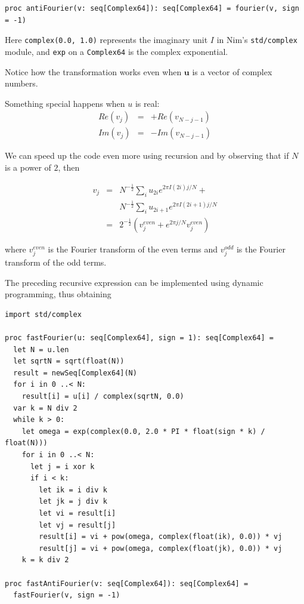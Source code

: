 \documentclass[justified, sixbynine]{tufte-book}
\def\ft{\small\tt}
\theoremstyle{plain}%
\newtheorem * {corollary}{Corollary}
\theoremstyle{definition}
\theoremstyle{remark}
\newtheorem * {remark}{Remark}
\newtheorem * {note}{Note}
\begin{document}
\begin{fullwidth}
\begin{lstlisting}
proc antiFourier(v: seq[Complex64]): seq[Complex64] = fourier(v, sign = -1)
\end{lstlisting}

Here {\ft complex(0.0, 1.0)} represents the imaginary unit $I$ in Nim's {\ft std/complex} module, and {\ft exp} on a {\ft Complex64} is the complex exponential.

Notice how the transformation works even when $\mathbf{u}$ is a vector of complex numbers.

Something special happens when $u$ is real:
\begin{eqnarray}
Re(v_j) &=& +Re(v_{N-j-1}) \\
Im(v_j) &=& -Im(v_{N-j-1})
\end{eqnarray}

We can speed up the code even more using recursion and by observing that if $N$ is a power of $2$, then

\begin{eqnarray}
v_j &=& N^{-\frac12} \sum_i u_{2i} e^{2\pi I (2i)j/N} + \\
             &&  N^{-\frac12} \sum_i u_{2i+1} e^{2\pi I (2i+1)j/N} \\
             &=& 2^{-\frac12} ( v_j^{even} + e^{2\pi j/N} v_j^{even} )
\end{eqnarray}

where $v_j^{even}$ is the Fourier transform of the even terms and $v_j^{odd}$ is the Fourier transform of the odd terms.

The preceding recursive expression can be implemented using dynamic programming, thus obtaining


\begin{lstlisting}
import std/complex

proc fastFourier(u: seq[Complex64], sign = 1): seq[Complex64] =
  let N = u.len
  let sqrtN = sqrt(float(N))
  result = newSeq[Complex64](N)
  for i in 0 ..< N:
    result[i] = u[i] / complex(sqrtN, 0.0)
  var k = N div 2
  while k > 0:
    let omega = exp(complex(0.0, 2.0 * PI * float(sign * k) / float(N)))
    for i in 0 ..< N:
      let j = i xor k
      if i < k:
        let ik = i div k
        let jk = j div k
        let vi = result[i]
        let vj = result[j]
        result[i] = vi + pow(omega, complex(float(ik), 0.0)) * vj
        result[j] = vi + pow(omega, complex(float(jk), 0.0)) * vj
    k = k div 2

proc fastAntiFourier(v: seq[Complex64]): seq[Complex64] =
  fastFourier(v, sign = -1)
\end{lstlisting}


\end{fullwidth}
\end{document}
